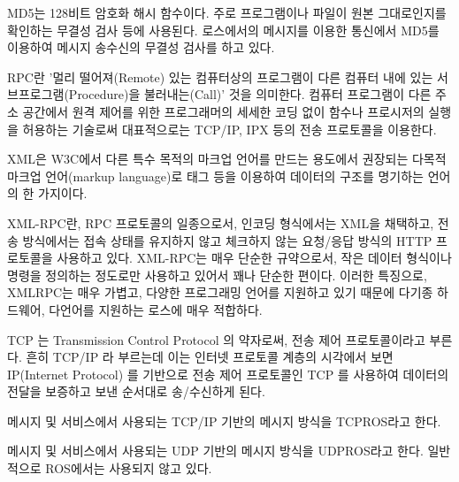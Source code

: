 \begin{definition}
MD5는 128비트 암호화 해시 함수이다. 주로 프로그램이나 파일이 원본 그대로인지를 확인하는 무결성 검사 등에 사용된다. 로스에서의 메시지를 이용한 통신에서 MD5를 이용하여 메시지 송수신의 무결성 검사를 하고 있다.
\end{definition}

\begin{definition}
RPC란 '멀리 떨어져(Remote) 있는 컴퓨터상의 프로그램이 다른 컴퓨터 내에 있는 서브프로그램(Procedure)을 불러내는(Call)' 것을 의미한다. 컴퓨터 프로그램이 다른 주소 공간에서 원격 제어를 위한 프로그래머의 세세한 코딩 없이 함수나 프로시저의 실행을 허용하는 기술로써 대표적으로는 TCP/IP, IPX 등의 전송 프로토콜을 이용한다. 
\end{definition}

\begin{definition}
XML은 W3C에서 다른 특수 목적의 마크업 언어를 만드는 용도에서 권장되는 다목적 마크업 언어(markup language)로 태그 등을 이용하여 데이터의 구조를 명기하는 언어의 한 가지이다. 
\end{definition}

\begin{definition}[XMLRPC]
XML-RPC란, RPC 프로토콜의 일종으로서, 인코딩 형식에서는 XML을 채택하고, 전송 방식에서는 접속 상태를 유지하지 않고 체크하지 않는 요청/응답 방식의 HTTP 프로토콜을 사용하고 있다. XML-RPC는 매우 단순한 규약으로서, 작은 데이터 형식이나 명령을 정의하는 정도로만 사용하고 있어서 꽤나 단순한 편이다. 이러한 특징으로, XMLRPC는 매우 가볍고, 다양한 프로그래밍 언어를 지원하고 있기 때문에 다기종 하드웨어, 다언어를 지원하는 로스에 매우 적합하다.
\end{definition}

\begin{definition}
TCP 는 Transmission Control Protocol 의 약자로써, 전송 제어 프로토콜이라고 부른다. 흔히 TCP/IP 라 부르는데 이는 인터넷 프로토콜 계층의 시각에서 보면 IP(Internet Protocol) 를 기반으로 전송 제어 프로토콜인 TCP 를 사용하여 데이터의 전달을 보증하고 보낸 순서대로 송/수신하게 된다. 
\end{definition}

\begin{definition}[TCPROS]
메시지 및 서비스에서 사용되는 TCP/IP 기반의 메시지 방식을 TCPROS라고 한다.
\end{definition}

\begin{definition}[UDPROS]
메시지 및 서비스에서 사용되는 UDP 기반의 메시지 방식을 UDPROS라고 한다. 일반적으로 ROS에서는 사용되지 않고 있다.
\end{definition}


